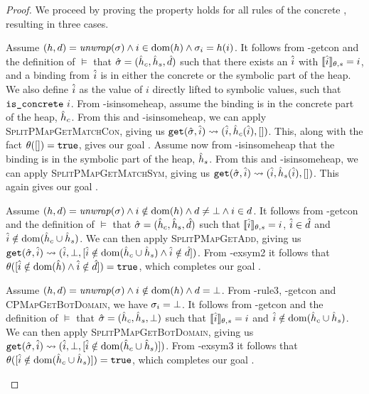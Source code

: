 \begin{proof}
We proceed by proving the property holds for all rules of the concrete , resulting in three cases.


\begin{hypvlist}
 Assume $(h,d)={\operatorname{\mathit{unwrap}}}(\sigma) \land i\in\operatorname{dom}(h) \land \sigma_{i}=h(i)$.
 It follows from \hyp{getcon} and the definition of $\models$ that $\hat{\sigma}=(\hat{h}_c, \hat{h}_s, \hat{d})$ such that there exists an $\hat{i}$ with $\llbracket\hat{i}\rrbracket_{\theta,s}=i$, and a binding from $\hat{i}$ is in either the concrete or the symbolic part of the heap. We also define $\hat{i}$ as the value of $i$ directly lifted to symbolic values, such that $\texttt{is\_concrete}~i$.
 From \hyp{isinsomeheap}, assume the binding is in the concrete part of the heap, $\hat{h}_c$. From this and \hyp{isinsomeheap}, we can apply \textsc{SplitPMapGetMatchCon}, giving us $\texttt{get}(\hat{\sigma},\hat{i})\rightsquigarrow(\hat{i}, \hat{h}_c(\hat{i}), [])$. This, along with the fact $\theta([])=\texttt{true}$, gives our goal .
 Assume now from \hyp{isinsomeheap} that the binding is in the symbolic part of the heap, $\hat{h}_s$. From this and \hyp{isinsomeheap}, we can apply \textsc{SplitPMapGetMatchSym}, giving us $\texttt{get}(\hat{\sigma},\hat{i})\rightsquigarrow(\hat{i}, \hat{h}_s(\hat{i}), [])$. This again gives our goal .
\end{hypvlist}


\begin{hypvlist}
 Assume $(h,d)={\operatorname{\mathit{unwrap}}}(\sigma) \land i\notin\operatorname{dom}(h) \land d\neq\bot \land i\in d$.
 It follows from \hyp{getcon} and the definition of $\models$ that $\hat{\sigma}=(\hat{h}_c, \hat{h}_s, \hat{d})$ such that $\llbracket\hat{i}\rrbracket_{\theta,s}=i$, $\hat{i}\in \hat{d}$ and $\hat{i}\notin \operatorname{dom}(\hat{h}_c \cup \hat{h}_s)$.
 We can then apply \textsc{SplitPMapGetAdd}, giving us $\texttt{get}(\hat{\sigma},\hat{i})\rightsquigarrow(\hat{i},\bot,[\hat{i}\notin \operatorname{dom}(\hat{h}_c \cup \hat{h}_s) \land \hat{i}\notin \hat{d}])$.%
 From \hyp{exsym2} it follows that $\theta([\hat{i}\notin \operatorname{dom}(\hat{h}) \land \hat{i}\notin \hat{d}])=\texttt{true}$, which completes our goal .
\end{hypvlist}


\begin{hypvlist}
 Assume $(h,d)={\operatorname{\mathit{unwrap}}}(\sigma) \land i\notin\operatorname{dom}(h) \land d=\bot$.
 From \hyp{rule3}, \hyp{getcon} and \textsc{CPMapGetBotDomain}, we have $\sigma_i=\bot$.
 It follows from \hyp{getcon} and the definition of $\models$ that $\hat{\sigma}=(\hat{h}_c, \hat{h}_s, \bot)$ such that $\llbracket\hat{i}\rrbracket_{\theta,s}=i$ and $\hat{i}\notin \operatorname{dom}(\hat{h}_c\cup \hat{h}_s)$.
 We can then apply \textsc{SplitPMapGetBotDomain}, giving us ${\texttt{get}(\hat{\sigma},\hat{i})\rightsquigarrow(\hat{i},\bot,[\hat{i}\notin \operatorname{dom}(\hat{h}_c\cup \hat{h}_s)])}$.%
 From \hyp{exsym3} it follows that $\theta([\hat{i}\notin \operatorname{dom}(\hat{h}_c\cup\hat{h}_s)])=\texttt{true}$, which completes our goal .
\end{hypvlist}

\end{proof}
